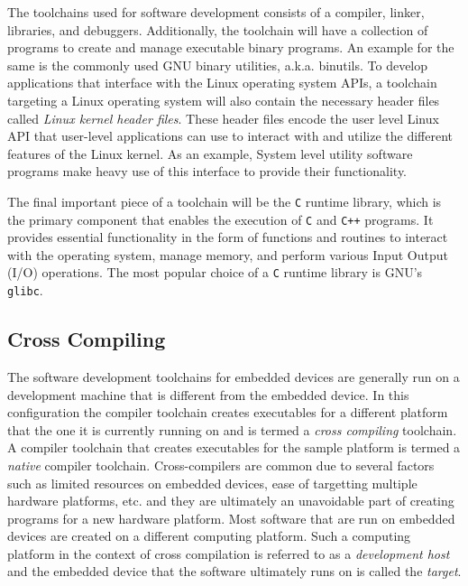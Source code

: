 The toolchains used for software development consists of a compiler, linker, libraries, and debuggers. Additionally, the toolchain will have a collection of programs to create and manage executable binary programs. An example for the same is the commonly used GNU binary utilities, a.k.a. binutils. To develop applications that interface with the Linux operating system APIs, a toolchain targeting a Linux operating system will also contain the necessary header files called \textit{Linux kernel header files}. These header files encode the user level Linux API that user-level applications can use to interact with and utilize the different features of the Linux kernel. As an example, System level utility software programs make heavy use of this interface to provide their functionality.

The final important piece of a toolchain will be the \texttt{C} runtime library, which is the primary component that enables the execution of \texttt{C} and \texttt{C++} programs. It provides essential functionality in the form of functions and routines to interact with the operating system, manage memory, and perform various Input Output (I/O) operations. The most popular choice of a \texttt{C} runtime library is GNU's \texttt{glibc}.

\subsection{Cross Compiling}

The software development toolchains for embedded devices are generally run on a development machine that is different from the embedded device. In this configuration the compiler toolchain creates executables for a different platform that the one it is currently running on and is termed a \textit{cross compiling} toolchain. A compiler toolchain that creates executables for the sample platform is termed a \textit{native} compiler toolchain. Cross-compilers are common due to several factors such as limited resources on embedded devices, ease of targetting multiple hardware platforms, etc. and they are ultimately an unavoidable part of creating programs for a new hardware platform. Most software that are run on embedded devices are created on a different computing platform. Such a computing platform in the context of cross compilation is referred to as a \textit{development host} and the embedded device that the software ultimately runs on is called the \textit{target}.

